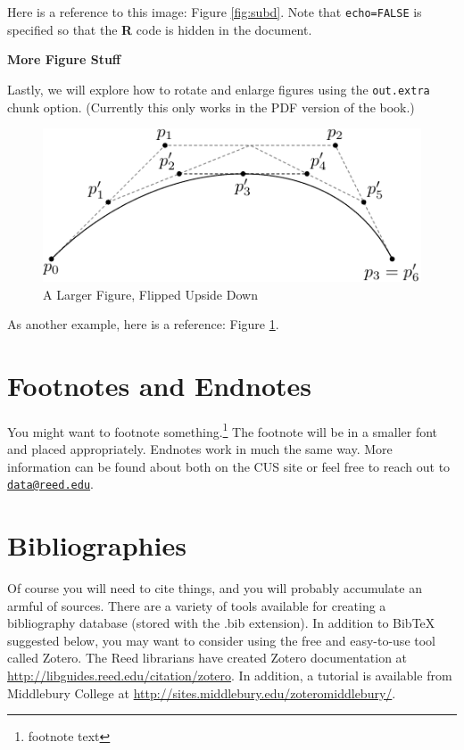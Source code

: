 \documentclass[12pt,twoside]{reedthesis}
\begin{document}
  Here is a reference to this image: Figure \ref{fig:subd}. Note that
  \texttt{echo=FALSE} is specified so that the \textbf{R} code is hidden
  in the document.
  
  \textbf{More Figure Stuff}
  
  Lastly, we will explore how to rotate and enlarge figures using the
  \texttt{out.extra} chunk option. (Currently this only works in the PDF
  version of the book.)
  
  \begin{figure}
  
  {\centering \includegraphics[angle=180, scale=1.1]{figure/subdivision} 
  
  }
  
  \caption[A Larger Figure, Flipped Upside Down]{A Larger Figure, Flipped Upside Down}\label{fig:subd2}
  \end{figure}
  
  As another example, here is a reference: Figure \ref{fig:subd2}.
  
  \section{Footnotes and Endnotes}\label{footnotes-and-endnotes}
  
  You might want to footnote something.\footnote{footnote text} The
  footnote will be in a smaller font and placed appropriately. Endnotes
  work in much the same way. More information can be found about both on
  the CUS site or feel free to reach out to
  \href{mailto:data@reed.edu}{\nolinkurl{data@reed.edu}}.
  
  \section{Bibliographies}\label{bibliographies}
  
  Of course you will need to cite things, and you will probably accumulate
  an armful of sources. There are a variety of tools available for
  creating a bibliography database (stored with the .bib extension). In
  addition to BibTeX suggested below, you may want to consider using the
  free and easy-to-use tool called Zotero. The Reed librarians have
  created Zotero documentation at
  \url{http://libguides.reed.edu/citation/zotero}. In addition, a tutorial
  is available from Middlebury College at
  \url{http://sites.middlebury.edu/zoteromiddlebury/}.
  
\end{document}
